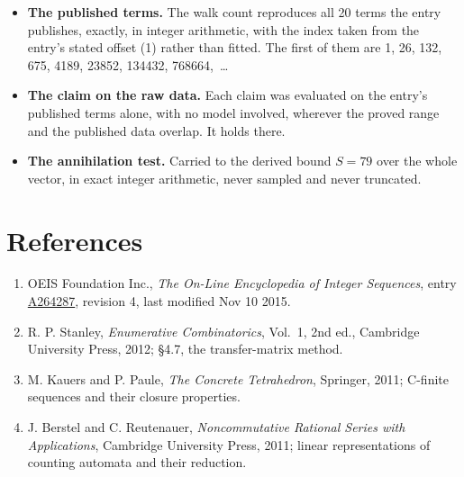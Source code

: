 \documentclass[11pt]{article}
\theoremstyle{definition}
\begin{document}
\begin{itemize}

\item {\bfseries The published terms.} The walk count reproduces all 20 terms the entry publishes, exactly, in integer arithmetic, with the index taken from the entry's stated offset (1) rather than fitted. The first of them are 1, 26, 132, 675, 4189, 23852, 134432, 768664,~\dots

\item {\bfseries The claim on the raw data.} Each claim was evaluated on the entry's published terms alone, with no model involved, wherever the proved range and the published data overlap. It holds there.

\item {\bfseries The annihilation test.} Carried to the derived bound $S = 79$ over the whole vector, in exact integer arithmetic, never sampled and never truncated.

\end{itemize}

\section{References}

\begin{enumerate}

\item OEIS Foundation Inc., \emph{The On-Line Encyclopedia of Integer Sequences}, entry \href{https://oeis.org/A264287}{A264287}, revision 4, last modified Nov 10 2015.

\item R. P. Stanley, \emph{Enumerative Combinatorics}, Vol.~1, 2nd ed., Cambridge University Press, 2012; \S4.7, the transfer-matrix method.

\item M. Kauers and P. Paule, \emph{The Concrete Tetrahedron}, Springer, 2011; C-finite sequences and their closure properties.

\item J. Berstel and C. Reutenauer, \emph{Noncommutative Rational Series with Applications}, Cambridge University Press, 2011; linear representations of counting automata and their reduction.

\end{enumerate}
\end{document}
